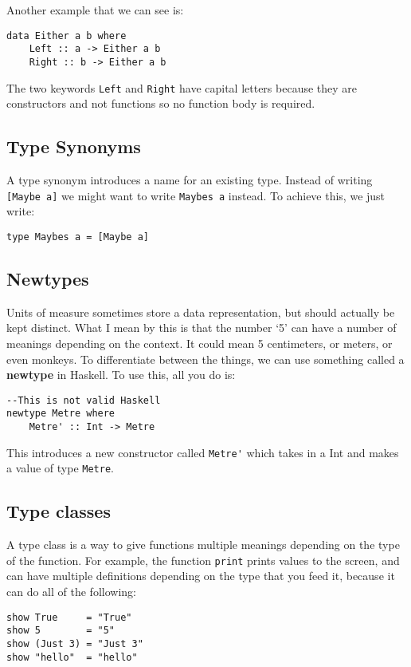 \documentclass[11pt,a4paper,titlepage,dvipsnames,cmyk]{scrartcl}
\begin{document}
Another example that we can see is:
\begin{lstlisting}[style=B]
data Either a b where
    Left :: a -> Either a b
    Right :: b -> Either a b
\end{lstlisting}
The two keywords \lstinline|Left| and \lstinline|Right| have capital
letters because they are constructors and not functions so no function
body is required.
\subsection{Type Synonyms}%
\label{sub:synonyms}
A type synonym introduces a name for an existing type. Instead of writing
\lstinline|[Maybe a]| we might want to write \lstinline|Maybes a| instead.
To achieve this, we just write:

\begin{lstlisting}[style=B]
type Maybes a = [Maybe a]
\end{lstlisting}

\subsection{Newtypes}%
\label{sub:Newtypes}
Units of measure sometimes store a data representation, but should
actually be kept distinct. What I mean by this is that the number `5' can
have a number of meanings depending on the context. It could mean 5
centimeters, or meters, or even monkeys. To differentiate between the
things, we can use something called a \textbf{newtype} in Haskell. To use
this, all you do is:
\begin{lstlisting}[style=B]
--This is not valid Haskell
newtype Metre where
    Metre' :: Int -> Metre

\end{lstlisting}

This introduces a new constructor called \lstinline|Metre'| which takes in a Int
and makes a value of type \lstinline|Metre|.

\subsection{Type classes}%
\label{sub:types}
A type class is a way to give functions multiple meanings depending on the
type of the function. For example, the function \lstinline|print| prints
values to the screen, and can have multiple definitions depending on the
type that you feed it, because it can do all of the following:
\begin{lstlisting}[style=B]
show True     = "True"
show 5        = "5"
show (Just 3) = "Just 3"
show "hello"  = "hello"
\end{lstlisting}
\end{document}
